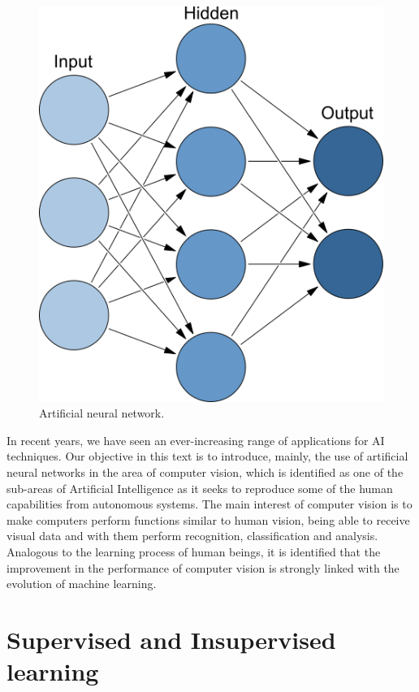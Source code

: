 \begin{figure}
    \centering
    \includegraphics[scale=0.8]{"Part 3 - Learning Systems/Introduction/figure102.png"}
    \caption{Artificial neural network.}
    \label{fig:figure102}
\end{figure}

In recent years, we have seen an ever-increasing range of applications for AI techniques. Our objective in this text is to introduce, mainly, the use of artificial neural networks in the area of computer vision, which is identified as one of the sub-areas of Artificial Intelligence as it seeks to reproduce some of the human capabilities from autonomous systems. The main interest of computer vision is to make computers perform functions similar to human vision, being able to receive visual data and with them perform recognition, classification and analysis. Analogous to the learning process of human beings, it is identified that the improvement in the performance of computer vision is strongly linked with the evolution of machine learning.

\section{Supervised and Insupervised learning}

